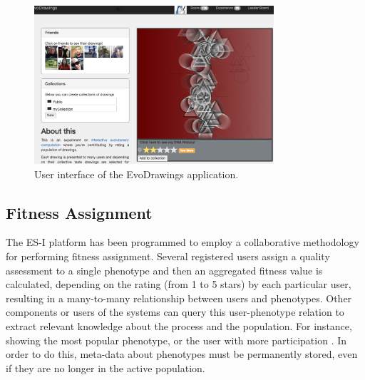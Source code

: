 \begin{figure}[!t]
    \centering
        \includegraphics[width=3.5in]{img/interface.png}
    \caption{User interface of the EvoDrawings application.}
    \label{fig:web}
\end{figure}

\subsection{Fitness Assignment}
The ES-I platform has been programmed to employ a 
collaborative methodology for performing fitness assignment. 
Several registered users assign a quality assessment to a single
phenotype and then an aggregated fitness value is calculated,
depending on the rating (from 1 to 5 stars) by each particular user,  
resulting in a many-to-many relationship between users and
phenotypes. Other components or users of the systems can 
query this user-phenotype relation to extract relevant
knowledge about the process and the population. For instance, showing the
most popular phenotype, or the user with more participation 
\cite{picbreeder}.
In order to do this, meta-data about phenotypes 
must be permanently stored, even
if they are no longer in the active population. 

